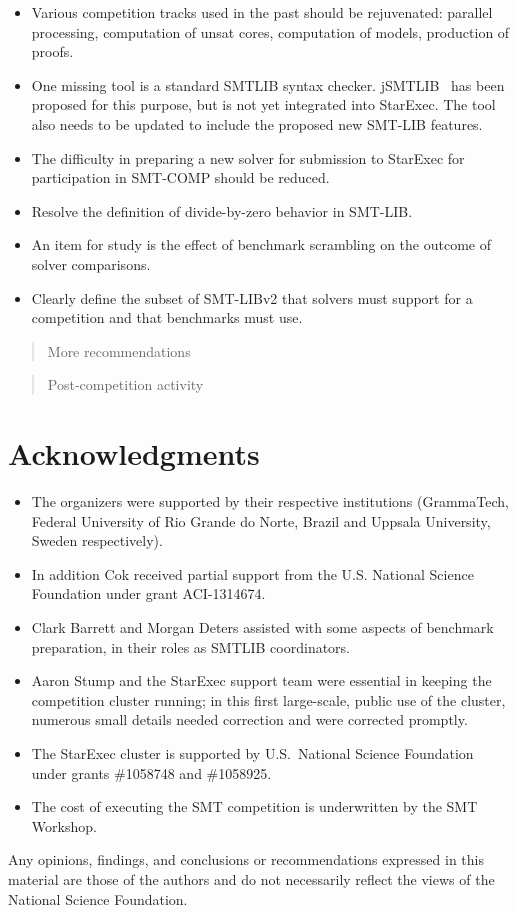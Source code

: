 \documentclass[twoside,11pt]{article}
\newcommand{\comment}[2]{\begin{quote}\sc #1\marginpar{\textcolor{red}{$\ast^{\mbox{#2}}$}}\end{quote}}
\newcommand{\davidc}[1]{\comment{#1}{DC}}
\begin{document}
\begin{itemize}
\item Various competition tracks used in the past should be rejuvenated: parallel processing, computation of unsat cores, computation of models, production of proofs.
\item One missing tool is a standard SMTLIB syntax checker. jSMTLIB~\cite{cok2011jsmtlib} has been proposed for this purpose, but is not yet integrated into StarExec. The tool also needs to be updated to include the proposed new SMT-LIB features.
\item The difficulty in preparing a new solver for submission to StarExec for participation in SMT-COMP should be reduced.
\item Resolve the definition of divide-by-zero behavior in SMT-LIB.
\item An item for study is the effect of benchmark scrambling on the outcome of solver comparisons.
\item Clearly define the subset of SMT-LIBv2 that solvers must support for a competition and that benchmarks must use.
\end{itemize}
\davidc{More recommendations}

\davidc{Post-competition activity}



\section*{Acknowledgments} 
\begin{itemize}
\item The organizers were supported by their respective institutions (GrammaTech, Federal University of Rio Grande do Norte, Brazil and Uppsala University, Sweden respectively). 

\item In addition Cok received partial support from the U.S. National Science Foundation
under grant ACI-1314674.

\item Clark Barrett and Morgan Deters assisted with some aspects of benchmark preparation,
in their roles as SMTLIB coordinators.

\item Aaron Stump and the StarExec support team were essential in keeping the competition cluster running;
in this first large-scale, public use of the cluster, numerous small details needed correction and were corrected promptly.

\item The StarExec cluster is supported by 
U.S.\ National Science Foundation under grants \#1058748 and \#1058925.


\item The cost of executing the SMT competition is underwritten by the SMT Workshop. 
\end{itemize}

Any opinions,
findings, and conclusions or recommendations expressed in this
material are those of the authors and do not necessarily reflect the
views of the National Science Foundation.



\end{document}
